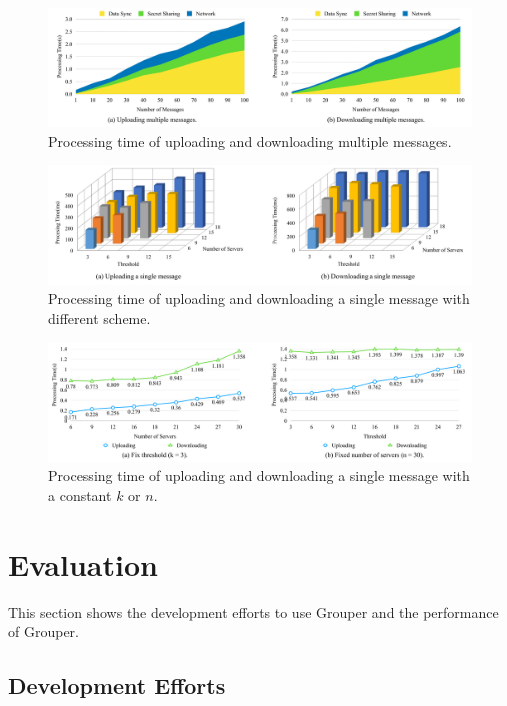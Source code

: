 \documentclass[twocolumn,10pt]{article}
\begin{document}
\begin{figure}[t]
	\centering
	\includegraphics[scale=0.13]{multiple_messages}
	\caption{Processing time of uploading and downloading multiple messages.}
\end{figure}

\begin{figure}[t]
	\centering
	\includegraphics[scale=0.35]{3d}
	\caption{Processing time of uploading and downloading a single message with different scheme.}
\end{figure}

\begin{figure}[t]
	\centering
	\includegraphics[scale=0.13]{constant_k_n}
	\caption{Processing time of uploading and downloading a single message with a constant ${k}$ or ${n}$.}
\end{figure}

\section{Evaluation}

This section shows the development efforts to use Grouper and the performance of Grouper.

\subsection{Development Efforts}
\end{document}
